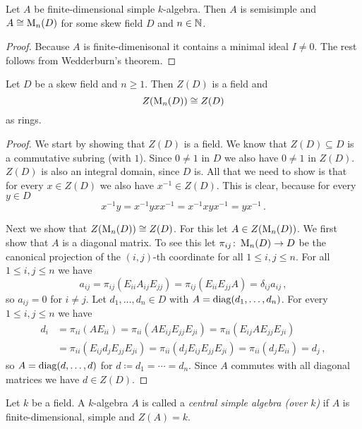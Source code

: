 \begin{cor}
  Let $A$ be finite-dimensional simple $k$-algebra.
  Then $A$ is semisimple and $A \cong \operatorname{M}_n(D)$ for some skew field $D$ and $n \in \mathbb{N}$.
\end{cor}
\begin{proof}
  Because $A$ is finite-dimenisonal it contains a minimal ideal $I \neq 0$.
  The rest follows from Wedderburn’s theorem.
\end{proof}


\begin{lem}
  Let $D$ be a skew field and $n \geq 1$.
  Then $Z(D)$ is a field and
  \[
    Z(\operatorname{M}_n(D)) \cong Z(D)
  \]
  as rings.
\end{lem}
\begin{proof}
  We start by showing that $Z(D)$ is a field.
  We know that $Z(D) \subseteq D$ is a commutative subring (with $1$).
  Since $0 \neq 1$ in $D$ we also have $0 \neq 1$ in $Z(D)$.
  $Z(D)$ is also an integral domain, since $D$ is.
  All that we need to show is that for every $x \in Z(D)$ we also have $x^{-1} \in Z(D)$.
  This is clear, because for every $y \in D$
  \[
      x^{-1} y
    = x^{-1} y x x^{-1}
    = x^{-1} x y x^{-1}
    = y x^{-1} \,.
  \]
  
  Next we show that $Z(\operatorname{M}_n(D)) \cong Z(D)$.
  For this let $A \in Z(\operatorname{M}_n(D))$.
  We first show that $A$ is a diagonal matrix.
  To see this let $\pi_{ij} \colon \operatorname{M}_n(D) \to D$ be the canonical projection of the $(i,j)$-th coordinate for all $1 \leq i,j \leq n$.
  For all $1 \leq i,j \leq n$ we have
  \[
      a_{ij}
    = \pi_{ij}(E_{ii} A_{ij} E_{jj})
    = \pi_{ij}(E_{ii} E_{jj} A)
    = \delta_{ij} a_{ij} \,,
  \]
  so $a_{ij} = 0$ for $i \neq j$.
  Let $d_1, \dotsc, d_n \in D$ with $A = \operatorname{diag}(d_1, \dotsc, d_n)$.
  For every $1 \leq i,j \leq n$ we have
  \begin{align*}
        d_i
    &=  \pi_{ii}(A E_{ii})
     =  \pi_{ii}(A E_{ij} E_{jj} E_{ji})
     =  \pi_{ii}(E_{ij} A E_{jj} E_{ji}) \\
    &=  \pi_{ii}(E_{ij} d_j E_{jj} E_{ji})
     =  \pi_{ii}(d_j E_{ij} E_{jj} E_{ji})
     =  \pi_{ii}(d_j E_{ii})
     =  d_j \,,
  \end{align*}
  so $A = \operatorname{diag}(d, \dotsc, d)$ for $d \coloneqq d_1 = \dotsb = d_n$.
  Since $A$ commutes with all diagonal matrices we have $d \in Z(D)$.
\end{proof}


\begin{defi}
  Let $k$ be a field.
  A $k$-algebra $A$ is called a \emph{central simple algebra (over $k$)} if $A$ is finite-dimensional, simple and $Z(A) = k$.
\end{defi}


